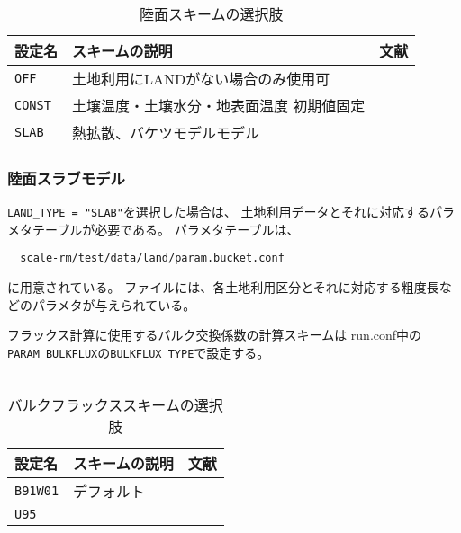 \begin{table}[h]
\begin{center}
  \caption{陸面スキームの選択肢}
  \label{tab:nml_land}
  \begin{tabularx}{150mm}{llX} \hline
    \rowcolor[gray]{0.9}  設定名 & スキームの説明 & 文献\\ \hline
      \verb|OFF|   & 土地利用にLANDがない場合のみ使用可  &  \\
      \verb|CONST| & 土壌温度・土壌水分・地表面温度 初期値固定 &  \\
      \verb|SLAB|  & 熱拡散、バケツモデルモデル   &  \\
    \hline
  \end{tabularx}
\end{center}
\end{table}



\subsubsection{陸面スラブモデル}
\verb|LAND_TYPE = "SLAB"|を選択した場合は、
土地利用データとそれに対応するパラメタテーブルが必要である。
パラメタテーブルは、
\begin{verbatim}
  scale-rm/test/data/land/param.bucket.conf
\end{verbatim}
に用意されている。
ファイルには、各土地利用区分とそれに対応する粗度長などのパラメタが与えられている。



フラックス計算に使用するバルク交換係数の計算スキームは
run.conf中の\verb|PARAM_BULKFLUX|の\verb|BULKFLUX_TYPE|で設定する。\\

\\

\begin{table}[h]
\begin{center}
  \caption{バルクフラックススキームの選択肢}
  \label{tab:nml_bulk}
  \begin{tabularx}{150mm}{llX} \hline
    \rowcolor[gray]{0.9}  設定名 & スキームの説明 & 文献\\ \hline
      \verb|B91W01| & デフォルト & \citet{beljaars_1991,wilson_2001}\\
      \verb|U95|    &            & \citet{uno_1995}\\
    \hline
  \end{tabularx}
\end{center}
\end{table}




